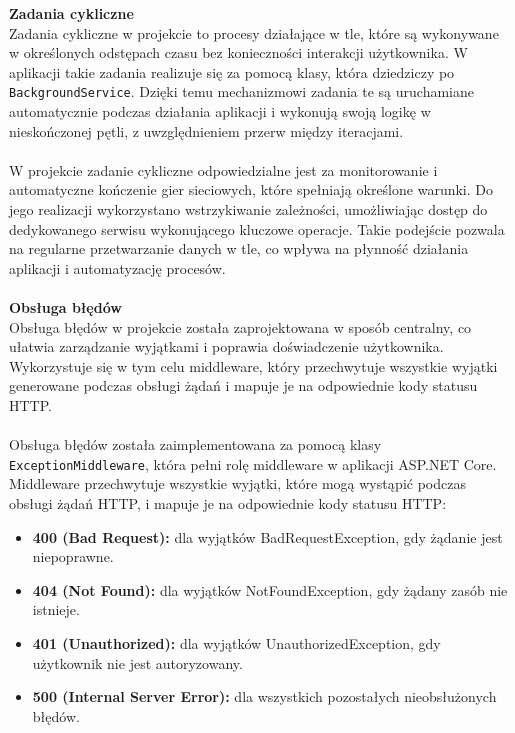 \documentclass[twoside]{projektInzynierskiMS1}
\begin{document}
\noindent


\newpage

\noindent \textbf{Zadania cykliczne}\\
Zadania cykliczne w projekcie to procesy działające w tle, które są wykonywane w określonych odstępach czasu bez konieczności interakcji użytkownika. W aplikacji takie zadania realizuje się za pomocą klasy, która dziedziczy po \texttt{BackgroundService}. Dzięki temu mechanizmowi zadania te są uruchamiane automatycznie podczas działania aplikacji i wykonują swoją logikę w nieskończonej pętli, z uwzględnieniem przerw między iteracjami.
\\\\
W projekcie zadanie cykliczne odpowiedzialne jest za monitorowanie i automatyczne kończenie gier sieciowych, które spełniają określone warunki. Do jego realizacji wykorzystano wstrzykiwanie zależności, umożliwiając dostęp do dedykowanego serwisu wykonującego kluczowe operacje. Takie podejście pozwala na regularne przetwarzanie danych w tle, co wpływa na płynność działania aplikacji i automatyzację procesów.
\\\\

\noindent \textbf{Obsługa błędów}\\
Obsługa błędów w projekcie została zaprojektowana w sposób centralny, co ułatwia zarządzanie wyjątkami i poprawia doświadczenie użytkownika. Wykorzystuje się w tym celu middleware, który przechwytuje wszystkie wyjątki generowane podczas obsługi żądań i mapuje je na odpowiednie kody statusu HTTP.
\\\\
Obsługa błędów została zaimplementowana za pomocą klasy \texttt{ExceptionMiddleware}, która pełni rolę middleware w aplikacji ASP.NET Core. Middleware przechwytuje wszystkie wyjątki, które mogą wystąpić podczas obsługi żądań HTTP, i mapuje je na odpowiednie kody statusu HTTP:

\begin{itemize}
    \item \textbf{400 (Bad Request):} dla wyjątków BadRequestException, gdy żądanie jest niepoprawne.
    \item \textbf{404 (Not Found):} dla wyjątków NotFoundException, gdy żądany zasób nie istnieje.
    \item \textbf{401 (Unauthorized):} dla wyjątków UnauthorizedException, gdy użytkownik nie jest autoryzowany.
    \item \textbf{500 (Internal Server Error):} dla wszystkich pozostałych nieobsłużonych błędów.
\end{itemize}
\end{document}
